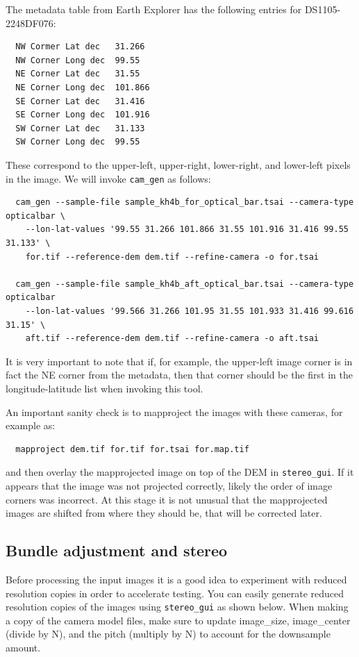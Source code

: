 The metadata table from Earth Explorer has the following entries
for DS1105-2248DF076:
\begin{verbatim}
  NW Cormer Lat dec   31.266
  NW Corner Long dec  99.55
  NE Corner Lat dec   31.55
  NE Corner Long dec  101.866
  SE Corner Lat dec   31.416
  SE Corner Long dec  101.916
  SW Corner Lat dec   31.133
  SW Corner Long dec  99.55
\end{verbatim}

These correspond to the upper-left, upper-right, lower-right, and lower-left
pixels in the image. We will invoke \texttt{cam\_gen} as follows:

\begin{verbatim}
  cam_gen --sample-file sample_kh4b_for_optical_bar.tsai --camera-type opticalbar \
    --lon-lat-values '99.55 31.266 101.866 31.55 101.916 31.416 99.55 31.133' \
    for.tif --reference-dem dem.tif --refine-camera -o for.tsai

  cam_gen --sample-file sample_kh4b_aft_optical_bar.tsai --camera-type opticalbar
    --lon-lat-values '99.566 31.266 101.95 31.55 101.933 31.416 99.616 31.15' \
    aft.tif --reference-dem dem.tif --refine-camera -o aft.tsai
\end{verbatim}

It is very important to note that if, for example, the upper-left image
corner is in fact the NE corner from the metadata, then that corner 
should be the first in the longitude-latitude list when invoking this tool.

An important sanity check is to mapproject the images with these
cameras, for example as:

\begin{verbatim}
  mapproject dem.tif for.tif for.tsai for.map.tif
\end{verbatim}

and then overlay the mapprojected image on top of the DEM in \texttt{stereo\_gui}.
If it appears that the image was not projected correctly, likely 
the order of image corners was incorrect. At this stage it is not unusual
that the mapprojected images are shifted from where they should be, that
will be corrected later. 

\subsection{Bundle adjustment and stereo}

Before processing the input images it is a good idea to experiment with
reduced resolution copies in order to accelerate testing.  You can easily
generate reduced resolution copies of the images using \texttt{stereo\_gui}
as shown below.  When making a copy of the camera model files, make sure to
update image\_size, image\_center (divide by N), and the pitch (multiply by N)
to account for the downsample amount.

